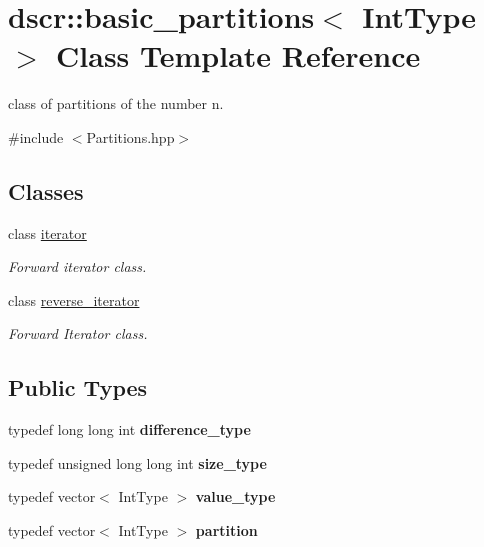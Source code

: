 \hypertarget{classdscr_1_1basic__partitions}{\section{dscr\-:\-:basic\-\_\-partitions$<$ Int\-Type $>$ Class Template Reference}
\label{classdscr_1_1basic__partitions}
}


class of partitions of the number n.  




{\ttfamily \#include $<$Partitions.\-hpp$>$}

\subsection*{Classes}
\begin{DoxyCompactItemize}
\item 
class \hyperlink{classdscr_1_1basic__partitions_1_1iterator}{iterator}
\begin{DoxyCompactList}\small\item\em Forward iterator class. \end{DoxyCompactList}\item 
class \hyperlink{classdscr_1_1basic__partitions_1_1reverse__iterator}{reverse\-\_\-iterator}
\begin{DoxyCompactList}\small\item\em Forward Iterator class. \end{DoxyCompactList}\end{DoxyCompactItemize}
\subsection*{Public Types}
\begin{DoxyCompactItemize}
\item 
\hypertarget{classdscr_1_1basic__partitions_ac5a16891433faee1cc5bf8317f42e7a1}{typedef long long int {\bfseries difference\-\_\-type}}\label{classdscr_1_1basic__partitions_ac5a16891433faee1cc5bf8317f42e7a1}

\item 
\hypertarget{classdscr_1_1basic__partitions_abf69209952351a1d1049fd4080a64fc8}{typedef unsigned long long int {\bfseries size\-\_\-type}}\label{classdscr_1_1basic__partitions_abf69209952351a1d1049fd4080a64fc8}

\item 
\hypertarget{classdscr_1_1basic__partitions_a755211f06e8a96287a7ceb7237075745}{typedef vector$<$ Int\-Type $>$ {\bfseries value\-\_\-type}}\label{classdscr_1_1basic__partitions_a755211f06e8a96287a7ceb7237075745}

\item 
\hypertarget{classdscr_1_1basic__partitions_af204e246963c3cb010238a89db766ed2}{typedef vector$<$ Int\-Type $>$ {\bfseries partition}}\label{classdscr_1_1basic__partitions_af204e246963c3cb010238a89db766ed2}

\end{DoxyCompactItemize}
